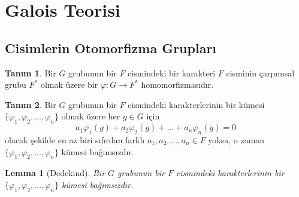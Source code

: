 \documentclass{article}
\newtheorem{lem}[thm]{Lemma}
\theoremstyle{definition}
\newtheorem{defn}{Tanım}[section]
\theoremstyle{remark}
\begin{document}
    \section{Galois Teorisi}
    	
    	\subsection{Cisimlerin Otomorfizma Grupları}
    	
    	    \begin{defn}
    	        Bir $G$ grubunun bir $F$ cismindeki bir karakteri $F$ cisminin çarpımsal grubu $F^*$ olmak üzere bir $\varphi: G \to F^*$ homomorfizmasıdır.
	    	\end{defn}
	    	
		    \begin{defn}
		        Bir $G$ grubunun bir $F$ cismindeki karakterlerinin bir kümesi\\$\{\varphi_1, \varphi_2, \dots, \varphi_n\}$ olmak üzere her $g \in G$ için
		        \begin{equation*}
				    a_1\varphi_1(g) + a_2\varphi_2(g) + \dots + a_n\varphi_n(g) = 0
		    	\end{equation*}
		    	olacak şekilde en az biri sıfırdan farklı $a_1, a_2, \dots, a_n \in F$ yoksa, o zaman $\{\varphi_1, \varphi_2, \dots, \varphi_n\}$ kümesi bağımsızdır.
		    \end{defn}
    	    
        	\begin{lem}[Dedekind]
        	    Bir $G$ grubunun bir $F$ cismindeki karakterlerinin bir $\{\varphi_1, \varphi_2, \dots, \varphi_n\}$ kümesi bağımsızdır.
    		\end{lem}
    		
\end{document}
